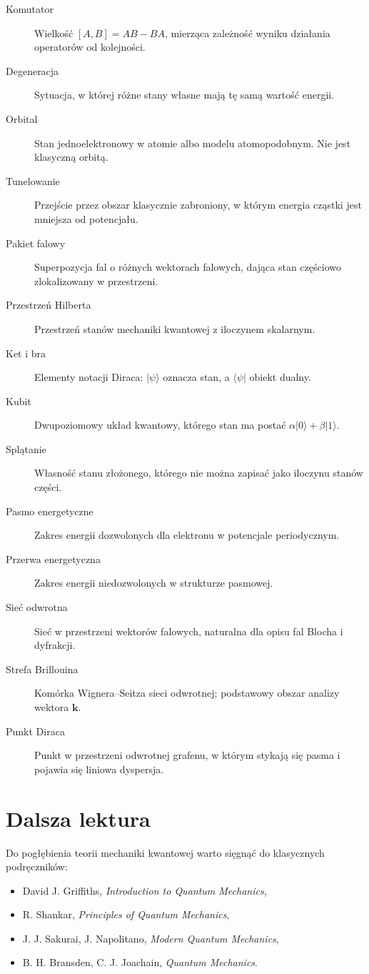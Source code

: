 \begin{description}
    \item[Komutator] Wielkość \([A,B]=AB-BA\), mierząca zależność wyniku działania operatorów od kolejności.
    \item[Degeneracja] Sytuacja, w której różne stany własne mają tę samą wartość energii.
    \item[Orbital] Stan jednoelektronowy w atomie albo modelu atomopodobnym. Nie jest klasyczną orbitą.
    \item[Tunelowanie] Przejście przez obszar klasycznie zabroniony, w którym energia cząstki jest mniejsza od potencjału.
    \item[Pakiet falowy] Superpozycja fal o różnych wektorach falowych, dająca stan częściowo zlokalizowany w przestrzeni.
    \item[Przestrzeń Hilberta] Przestrzeń stanów mechaniki kwantowej z iloczynem skalarnym.
    \item[Ket i bra] Elementy notacji Diraca: \(|\psi\rangle\) oznacza stan, a \(\langle\psi|\) obiekt dualny.
    \item[Kubit] Dwupoziomowy układ kwantowy, którego stan ma postać \(\alpha|0\rangle+\beta|1\rangle\).
    \item[Splątanie] Własność stanu złożonego, którego nie można zapisać jako iloczynu stanów części.
    \item[Pasmo energetyczne] Zakres energii dozwolonych dla elektronu w potencjale periodycznym.
    \item[Przerwa energetyczna] Zakres energii niedozwolonych w strukturze pasmowej.
    \item[Sieć odwrotna] Sieć w przestrzeni wektorów falowych, naturalna dla opisu fal Blocha i dyfrakcji.
    \item[Strefa Brillouina] Komórka Wignera--Seitza sieci odwrotnej; podstawowy obszar analizy wektora \(\mathbf{k}\).
    \item[Punkt Diraca] Punkt w przestrzeni odwrotnej grafenu, w którym stykają się pasma i pojawia się liniowa dyspersja.
\end{description}

\section{Dalsza lektura}

Do pogłębienia teorii mechaniki kwantowej warto sięgnąć do klasycznych podręczników:
\begin{itemize}
    \item David J. Griffiths, \emph{Introduction to Quantum Mechanics},
    \item R. Shankar, \emph{Principles of Quantum Mechanics},
    \item J. J. Sakurai, J. Napolitano, \emph{Modern Quantum Mechanics},
    \item B. H. Bransden, C. J. Joachain, \emph{Quantum Mechanics}.
\end{itemize}

